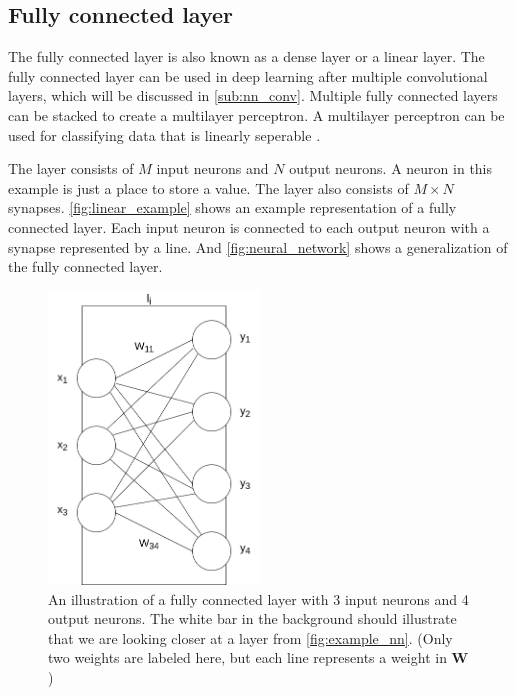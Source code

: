 \subsection{Fully connected layer}%
\label{sub:Fully connected layer}

The fully connected layer is also known as a dense layer or a linear layer.
The fully connected layer can be used in deep learning after multiple convolutional layers, which will be discussed in \autoref{sub:nn_conv}.
Multiple fully connected layers can be stacked to create a multilayer perceptron. A multilayer perceptron can be used for classifying data that is linearly seperable \cite{perceptron}.

The layer consists of $M$ input neurons and $N$ output neurons. A neuron in this example is just a place to store a value.
The layer also consists of $M\times N$ synapses.
\autoref{fig:linear_example} shows an example representation of a fully connected layer. Each input neuron is connected to each output neuron with a synapse represented by a line. And \autoref{fig:neural_network} shows a generalization of the fully connected layer.

\begin{figure}
    \centering
    \includegraphics[width=0.5\textwidth]{assets/linear-layer-example.png}
    \caption{An illustration of a fully connected layer with 3 input neurons and 4 output neurons. The white bar in the background should illustrate that we are looking closer at a layer from \autoref{fig:example_nn}. (Only two weights are labeled here, but each line represents a weight in $\bm{W}$)}
    \label{fig:linear_example}
\end{figure}

